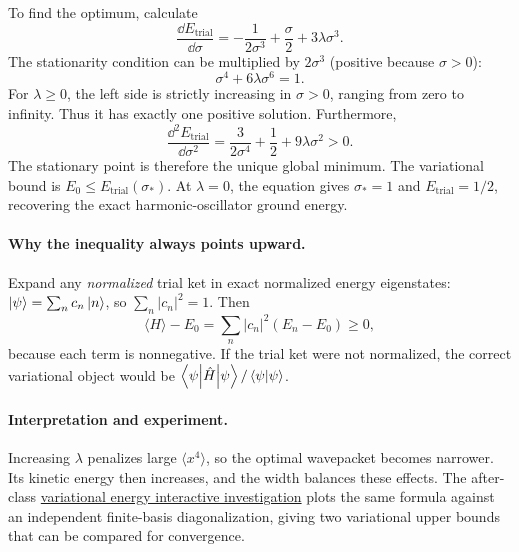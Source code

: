 To find the optimum, calculate
\begin{equation}
\frac{\dd E_{\mathrm{trial}}}{\dd\sigma}
=-\frac1{2\sigma^3}+\frac{\sigma}2
+3\lambda\sigma^3.
\end{equation}
The stationarity condition can be multiplied by
$2\sigma^3$ (positive because $\sigma>0$):
\begin{equation}
\boxed{\sigma^4+6\lambda\sigma^6=1.}
\end{equation}
For $\lambda\geq0$, the left side is strictly increasing
in $\sigma>0$, ranging from zero to infinity. Thus it
has exactly one positive solution.
Furthermore,
\begin{equation}
\frac{\dd^2 E_{\mathrm{trial}}}{\dd\sigma^2}
=\frac3{2\sigma^4}+\frac12+9\lambda\sigma^2>0.
\end{equation}
The stationary point is therefore the unique global minimum.
The variational bound is
$E_0\leq E_{\mathrm{trial}}(\sigma_\ast)$.
At $\lambda=0$, the equation gives $\sigma_\ast=1$
and $E_{\mathrm{trial}}=1/2$, recovering the exact
harmonic-oscillator ground energy.

\paragraph{Why the inequality always points upward.}
Expand any \emph{normalized} trial ket in exact normalized
energy eigenstates:
$\left|\psi\right\rangle=\sum_n c_n\left|n\right\rangle$, so
$\sum_n|c_n|^2=1$. Then
\begin{equation}
\langle H\rangle-E_0
=\sum_n|c_n|^2(E_n-E_0)\geq0,
\end{equation}
because each term is nonnegative. If the trial ket were not
normalized, the correct variational object would be
$\left\langle\psi\middle|\hat{H}\middle|\psi\right\rangle/\left\langle\psi\middle|\psi\right\rangle$.

\paragraph{Interpretation and experiment.}
Increasing $\lambda$ penalizes large $\langle x^4\rangle$,
so the optimal wavepacket becomes narrower. Its kinetic
energy then increases, and the width balances these effects.
The after-class
\href{https://kangqiaoliu.github.io/courses/advanced-quantum-mechanics/companion/labs/IC-04-02/index.html}
{variational energy interactive investigation}
plots the same formula against an independent finite-basis
diagonalization, giving two variational upper bounds that
can be compared for convergence.

